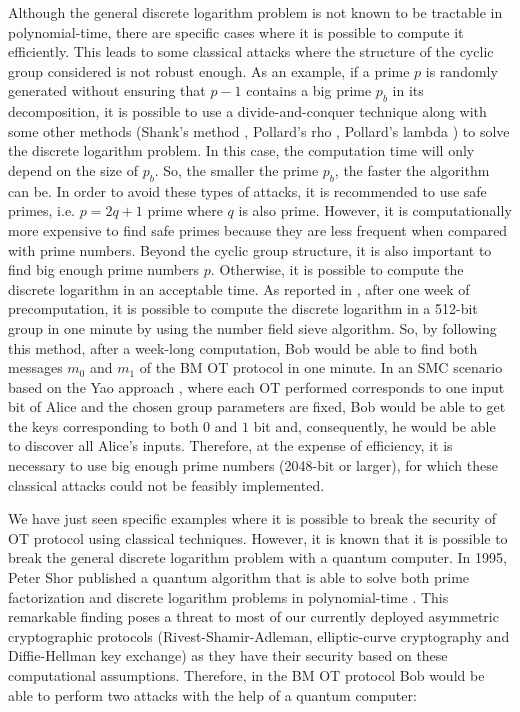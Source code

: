 Although the general discrete logarithm problem is not known to be tractable in polynomial-time, there are specific cases where it is possible to compute it efficiently. This leads to some classical attacks where the structure of the cyclic group considered is not robust enough. As an example, if a prime $p$ is randomly generated without ensuring that $p - 1$ contains a big prime $p_b$ in its decomposition, it is possible to use a divide-and-conquer technique \cite{PH78} along with some other methods (Shank's method \cite{S71}, Pollard's rho \cite{P78}, Pollard's lambda  \cite{P78}) to solve the discrete logarithm problem. In this case, the computation time will only depend on the size of $p_b$. So, the smaller the prime $p_b$, the faster the algorithm can be. In order to avoid these types of attacks, it is recommended to use safe primes, i.e. $p = 2q + 1$ prime where $q$ is also prime. However, it is computationally more expensive to find safe primes because they are less frequent when compared with prime numbers. Beyond the cyclic group structure, it is also important to find big enough prime numbers $p$. Otherwise, it is possible to compute the discrete logarithm in an acceptable time. As reported in \cite{ABDGGHHSTVVWZZ15}, after one week of precomputation, it is possible to compute the discrete logarithm in a 512-bit group in one minute by using the number field sieve algorithm. So, by following this method, after a week-long computation, Bob would be able to find both messages $m_0$ and $m_1$ of the BM OT protocol in one minute. In an SMC scenario based on the Yao approach \cite{Yao82}, where each OT performed corresponds to one input bit of Alice and the chosen group parameters are fixed, Bob would be able to get the keys corresponding to both $0$ and $1$ bit and, consequently, he would be able to discover all Alice's inputs. Therefore, at the expense of efficiency, it is necessary to use big enough prime numbers (2048-bit or larger), for which these classical attacks could not be feasibly implemented.

We have just seen specific examples where it is possible to break the security of OT protocol using classical techniques. However, it is known that it is possible to break the general discrete logarithm problem with a quantum computer. In 1995, Peter Shor published a quantum algorithm that is able to solve both prime factorization and discrete logarithm problems in polynomial-time \cite{Sho95}. This remarkable finding poses a threat to most of our currently deployed asymmetric cryptographic protocols (Rivest-Shamir-Adleman, elliptic-curve cryptography and Diffie-Hellman key exchange) as they have their security based on these computational assumptions. Therefore, in the BM OT protocol Bob would be able to perform two attacks with the help of a quantum computer:



